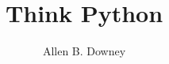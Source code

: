 \documentclass[10pt]{book}
\title{Think Python}
\author{Allen B. Downey}
\newif\ifplastex
\begin{document}
\frontmatter

\ifplastex
    \usepackage{localdef}
    \maketitle

\newcount\anchorcnt
\newcommand*{\Anchor}[1]{%
  \@bsphack%
    \Hy@GlobalStepCount\anchorcnt%
    \edef\@currentHref{anchor.\the\anchorcnt}%
    \Hy@raisedlink{\hyper@anchorstart{\@currentHref}\hyper@anchorend}%
    \M@gettitle{}\label{#1}%
    \@esphack%
}


\else

\newtheorem{exercise}{Ejercicio}[chapter]



\end{document}
